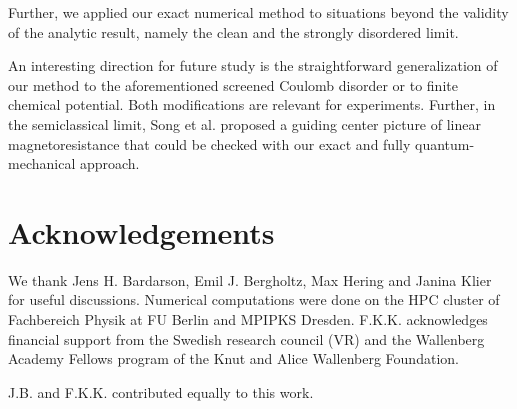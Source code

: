 \documentclass[aps,prb,10pt,amsmath,amssymb,twocolumn,floatfix,superscriptaddress,showpacs,numerical,footinbib]{revtex4-1}
\begin{document}
Further, we applied our exact numerical method to situations beyond the validity of the analytic result, namely the clean and the strongly disordered limit.

An interesting direction for future study is the straightforward generalization of our method to the aforementioned screened Coulomb disorder or to finite chemical potential.
%
Both modifications are relevant for experiments.
%
Further, in the semiclassical limit, Song et al.\cite{Song2015} proposed a guiding center picture of linear magnetoresistance that could be checked with our exact and fully quantum-mechanical approach. 

\section*{Acknowledgements}
We thank Jens H. Bardarson, Emil J. Bergholtz, Max Hering and Janina Klier for useful discussions. 
%
Numerical computations were done on the HPC cluster of Fachbereich Physik at FU Berlin and MPIPKS Dresden. 
%
F.K.K. acknowledges financial support from the Swedish research council (VR) and the Wallenberg Academy Fellows program of the Knut and Alice Wallenberg Foundation.

J.B. and F.K.K. contributed equally to this work.
\end{document}
